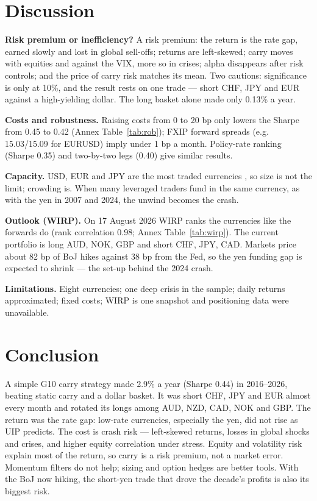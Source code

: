 \documentclass[11pt,a4paper]{article}
\begin{document}
\section{Discussion}
\textbf{Risk premium or inefficiency?} A risk premium: the return is the rate gap, earned slowly and lost in global
sell-offs; returns are left-skewed; carry moves with equities and against the VIX, more so in crises; alpha disappears after
risk controls; and the price of carry risk matches its mean. Two cautions: significance is only at 10\%, and the result rests
on one trade --- short CHF, JPY and EUR against a high-yielding dollar. The long basket alone made only 0.13\% a year.

\textbf{Costs and robustness.} Raising costs from 0 to 20 bp only lowers the Sharpe from 0.45 to 0.42 (Annex
Table~\ref{tab:rob}); FXIP forward spreads (e.g. 15.03/15.09 for EURUSD) imply under 1 bp a month. Policy-rate ranking
(Sharpe 0.35) and two-by-two legs (0.40) give similar results.

\textbf{Capacity.} USD, EUR and JPY are the most traded currencies \citep{bis2025}, so size is not the limit; crowding is.
When many leveraged traders fund in the same currency, as with the yen in 2007 and 2024, the unwind becomes the crash.

\textbf{Outlook (WIRP).} On 17 August 2026 WIRP ranks the currencies like the forwards do (rank correlation 0.98; Annex
Table~\ref{tab:wirp}). The current portfolio is long AUD, NOK, GBP and short CHF, JPY, CAD. Markets price about 82 bp of
BoJ hikes against 38 bp from the Fed, so the yen funding gap is expected to shrink --- the set-up behind the 2024 crash.

\textbf{Limitations.} Eight currencies; one deep crisis in the sample; daily returns approximated; fixed costs; WIRP is one
snapshot and positioning data were unavailable.

\section{Conclusion}
A simple G10 carry strategy made 2.9\% a year (Sharpe 0.44) in 2016--2026, beating static carry and a dollar basket. It was
short CHF, JPY and EUR almost every month and rotated its longs among AUD, NZD, CAD, NOK and GBP. The return was the rate
gap: low-rate currencies, especially the yen, did not rise as UIP predicts. The cost is crash risk --- left-skewed returns,
losses in global shocks and crises, and higher equity correlation under stress. Equity and volatility risk explain most of
the return, so carry is a risk premium, not a market error. Momentum filters do not help; sizing and option hedges are
better tools. With the BoJ now hiking, the short-yen trade that drove the decade's profits is also its biggest risk.
\end{document}
